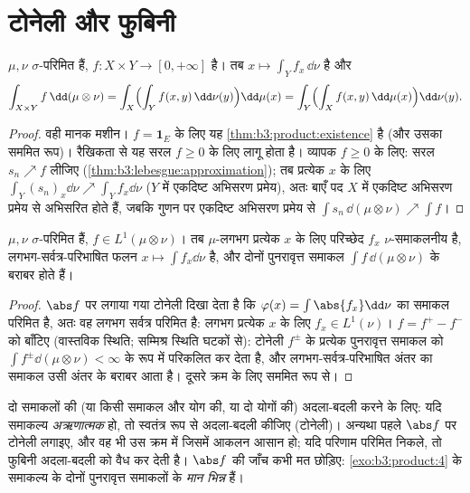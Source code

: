 \section{टोनेली और फुबिनी}

\begin{theorem}[टोनेली]\label{thm:b3:product:tonelli}
$\mu, \nu$ $\sigma$-परिमित हैं, $f \colon X\times Y \to [0,
+\infty]$  है। तब $x \mapsto \int_Y f_x\,\dd\nu$  है
और
\[
\int_{X\times Y}f\,\dd(\mu\otimes\nu)
= \int_X\Bigl(\int_Y f(x,y)\,\dd\nu(y)\Bigr)\dd\mu(x)
= \int_Y\Bigl(\int_X f(x,y)\,\dd\mu(x)\Bigr)\dd\nu(y).
\]
\end{theorem}

\begin{proof}
वही मानक मशीन। $f = \mathbf 1_E$ के लिए यह \cref{thm:b3:product:existence} है (और उसका सममित रूप)।
रैखिकता से यह सरल $f \geq 0$ के लिए लागू होता है। व्यापक $f \geq
0$ के लिए:
सरल $s_n \nearrow f$ लीजिए (\cref{thm:b3:lebesgue:approximation}); तब प्रत्येक $x$ के लिए $\int_Y(s_n)_x
\dd\nu \nearrow \int_Y f_x\dd\nu$ ($Y$
में एकदिष्ट अभिसरण प्रमेय), अतः बाएँ पद $X$ में एकदिष्ट अभिसरण
प्रमेय से अभिसरित होते हैं, जबकि गुणन पर एकदिष्ट अभिसरण प्रमेय से
$\int s_n\,\dd(\mu\otimes\nu) \nearrow \int f$।
\end{proof}

\begin{theorem}[फुबिनी]\label{thm:b3:product:fubini}
$\mu, \nu$ $\sigma$-परिमित हैं, $f \in L^1(\mu\otimes\nu)$। तब $\mu$-लगभग प्रत्येक $x$ के
लिए परिच्छेद $f_x$ $\nu$-समाकलनीय है, लगभग-सर्वत्र-परिभाषित फलन
$x \mapsto \int f_x\dd\nu$  है, और दोनों पुनरावृत्त समाकल $\int f\,\dd(\mu\otimes\nu)$ के बराबर
होते हैं।
\end{theorem}

\begin{proof}
$\abs f$ पर लगाया गया टोनेली दिखा देता है कि $\varphi(x) = \int\abs{f_x}
\dd\nu$ का समाकल परिमित
है, अतः वह लगभग सर्वत्र परिमित है: लगभग प्रत्येक $x$ के लिए
$f_x \in
L^1(\nu)$। $f = f^+ - f^-$ को बाँटिए (वास्तविक स्थिति; सम्मिश्र स्थिति घटकों
से): टोनेली $f^\pm$ के प्रत्येक पुनरावृत्त समाकल को $\int f^\pm\dd(\mu\otimes\nu) <
\infty$ के रूप में
परिकलित कर देता है, और लगभग-सर्वत्र-परिभाषित अंतर का समाकल उसी
अंतर के बराबर आता है। दूसरे क्रम के लिए सममित रूप से।
\end{proof}

\begin{method}\label{met:b3:product:fubini}
दो समाकलों की (या किसी समाकल और योग की, या दो योगों की) अदला-बदली
करने के लिए: यदि समाकल्य \emph{अऋणात्मक} हो, तो स्वतंत्र रूप से
अदला-बदली कीजिए (टोनेली)। अन्यथा पहले $\abs f$ पर टोनेली लगाइए, और
वह भी उस क्रम में जिसमें आकलन आसान हो; यदि परिणाम परिमित निकले, तो
फुबिनी अदला-बदली को वैध कर देती है। $\abs f$ की जाँच कभी मत छोड़िए:
\cref{exo:b3:product:4} के समाकल्य के दोनों पुनरावृत्त समाकलों के \emph{मान भिन्न}
हैं।
\end{method}


